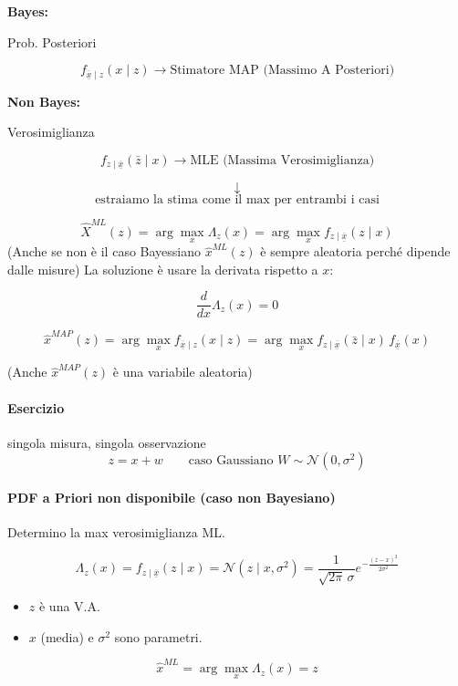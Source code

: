 \documentclass[11pt,a4paper]{article}
\begin{document}
\newpage

\textbf{Bayes:}

Prob. Posteriori

\[
f_{\overline{\underline{x}}\mid z}(x\mid z) \rightarrow \text{Stimatore MAP (Massimo A Posteriori)}
\]

\textbf{Non Bayes:}

Verosimiglianza

\[
f_{z\mid \overline{\underline{x}}}(\bar z\mid x) \rightarrow \text{MLE (Massima Verosimiglianza)}
\]

\[
\downarrow 
\]
\[
\text{estraiamo la stima come il max per entrambi i casi}
\]

\[
\hat X^{ML}(z)
=
\arg\max_x \Lambda_z(x)
=
\arg\max_x f_{z\mid \overline{\underline{x}}}( z\mid x)
\]
(Anche se non è il caso Bayessiano $\hat x^{ML}(z)$ è sempre aleatoria perché dipende dalle misure)
La soluzione è usare la derivata rispetto
a $x$:

\[
\frac{d}{dx}\Lambda_z(x)=0
\]

\[
\hat x^{MAP}(z)
=
\arg\max_x f_{\overline{\underline{x}}\mid z}(x\mid z)
=
\arg\max_x f_{z\mid \overline{\underline{x}}}(\bar z\mid x)\,f_{\overline{\underline{x}}}(x)
\]

(Anche $\hat x^{MAP}(z)$ è una variabile aleatoria)

\paragraph{Esercizio}

singola misura, singola osservazione
\[
z=x+w
\qquad
\text{caso Gaussiano } W\sim \mathcal N(0,\sigma^2)
\]

\paragraph{PDF a Priori non disponibile (caso non Bayesiano)}
Determino la max verosimiglianza ML.

\[
\Lambda_z(x)
=
f_{z\mid \overline{\underline{x}}}(z\mid x)
=
\mathcal N(z\mid x,\sigma^2)
=
\frac{1}{\sqrt{2\pi}\,\sigma}
e^{-\frac{(z-x)^2}{2\sigma^2}}
\]

\begin{itemize}
    \item $z$ è una V.A.
    \item $x$ (media) e $\sigma^2$ sono parametri.
\end{itemize}

\[
\hat x^{ML}
=
\arg\max_x \Lambda_z(x)
=
z
\]
\end{document}
